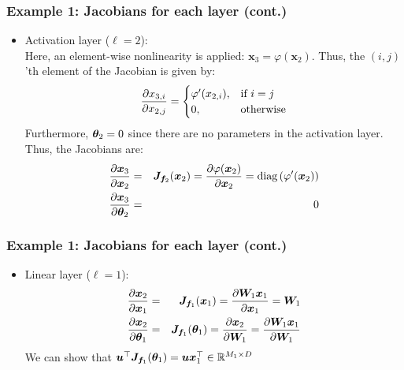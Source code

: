 \documentclass[smaller]{beamer}
\begin{document}
\begin{frame}
  \frametitle{Example 1: Jacobians for each layer (cont.)}\pause
\begin{itemize}
\setcounter{enumi}{2}
  \item Activation layer ($\ell = 2$):\\
  Here, an element-wise nonlinearity is applied: $\bm x_3 = \varphi(\bm x_2)$. Thus, the $(i,j)$'th element of the Jacobian is given by:
  \begin{equation}
    \frac{\partial{x_{3,i}}}{\partial{x_{2,j}}} = \begin{cases}
      \varphi'(x_{2,i}), & \text{if } i = j \\
      0, & \text{otherwise}
    \end{cases}
  \end{equation}\pause
    Furthermore, $\bm{\theta}_2 = 0$ since there are no parameters in the activation layer. Thus, the Jacobians are: \pause
    \begin{eqnarray}
    \frac{\partial{\bm x_3}}{\partial{\bm x_2}} &=& \bm J_{\bm f_2}(\bm x_2) = \frac{\partial{\varphi(\bm x_2)}}{\partial{\bm x_2}} = \text{diag}\left(\varphi'(\bm x_2)\right) \\
    \frac{\partial{\bm x_3}}{\partial{\bm{\theta}_2}} &=& 0
  \end{eqnarray}
\end{itemize} 
\end{frame}


\begin{frame}
  \frametitle{Example 1: Jacobians for each layer (cont.)}\pause
\begin{itemize}
\setcounter{enumi}{3}
  \item Linear layer ($\ell = 1$):
    \begin{eqnarray}
    \pd{\bm x_2}{\bm x_1} &=& \bm J_{\bm f_1}(\bm x_1) = \pd{\bm W_1 \bm x_1}{\bm x_1} = \bm W_1 \\
    \pd{\bm x_2}{\bm \th_1} &=& \bm J_{\bm f_1}(\bm \th_1) = \pd{\bm x_2}{\bm W_1} = \pd{\bm W_1 \bm x_1}{\bm W_1} %
  \end{eqnarray}  
  We can show that $\bm u^{\top} \bm J_{\bm f_1}(\bm {\theta}_1) = \bm u \bm x_1^{\top} \in \mathbb{R}^{M_1 \times D}$
\end{itemize} 
\end{frame}
\end{document}
